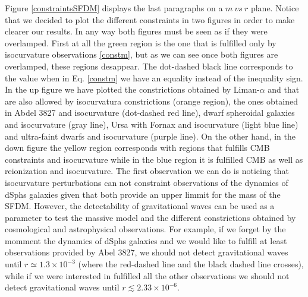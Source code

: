 \documentclass[amssymb,twocolumn,prd,nofootinbib,showpacs]{revtex4-1}
\begin{document}
 Figure \ref{constraintsSFDM} displays the last paragraphs on a $m\ vs\ r$ plane. Notice that we decided to plot the different constraints in two figures in order to make clearer our results. In any way both figures must be seen as if they were overlamped. First at all the green region is the one that is fulfilled only by isocurvature observations \eqref{constm}, but as we can see once both figures are overlamped, these regions desappear. The dot-dashed black line corresponds to the value when in Eq. \eqref{constm} we have an equality instead of the inequality sign.  In the up figure we have plotted the constrictions obtained by Liman-$\alpha$ and that are also allowed by isocurvatura constrictions (orange region), the ones obtained in Abdel 3827 and isocurvature (dot-dashed red line), dwarf spheroidal galaxies and isocurvature (gray line), Ursa with Fornax and isocurvature (light blue line) and ultra-faint dwarfs and isocurvature (purple line). On the other hand, in the down figure the yellow region corresponds with regions that fulfills CMB constraints and isocurvature while in the blue region it is fulfilled CMB as well as reionization and isocurvature. The first observation we can do is noticing that isocurvature perturbations can not constraint observations of the dynamics of dSphs galaxies given that both provide an upper limmit for the mass of the SFDM. However, the detectability of gravitational waves can be used as a parameter to test the massive model and the different constrictions obtained by cosmological and astrophysical observations. For example, if we forget by the momment the dynamics of dSphs galaxies and we would like to fulfill at least observations provided by Abel 3827, we should not detect gravitational waves until $r\simeq 1.3\times 10^{-3}$ (where the red-dashed line and the black dashed line crosses), while if we were interested in fulfilled all the other observations we should not detect gravitational waves until $r\lesssim 2.33\times 10^{-6}$. 
 
\end{document}
